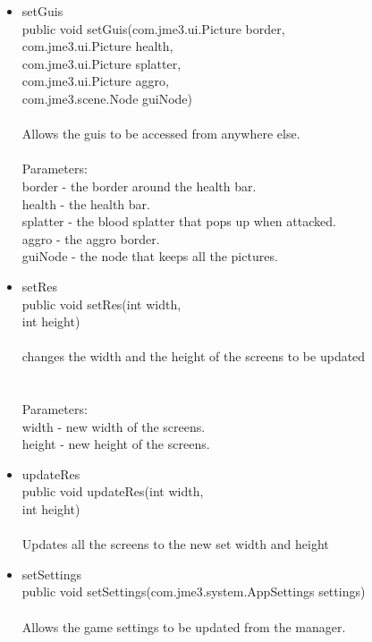 \documentclass[letterpaper]{article}
\begin{document}
\begin{itemize}
\begin{itemize}
		
		\item setGuis \\
		public void setGuis(com.jme3.ui.Picture border, \\
		com.jme3.ui.Picture health, \\
		com.jme3.ui.Picture splatter, \\
		com.jme3.ui.Picture aggro, \\
		com.jme3.scene.Node guiNode) \\ \\
		Allows the guis to be accessed from anywhere else.\\ \\
		Parameters: \\
		    border - the border around the health bar.\\
		    health - the health bar. \\
		    splatter - the blood splatter that pops up when attacked. \\
		    aggro - the aggro border. \\
		    guiNode - the node that keeps all the pictures.\\
		
		
		\item setRes \\
		public void setRes(int width, \\
		int height) \\ \\
		changes the width and the height of the screens to be updated \\ \\ \\
		Parameters: \\
		    width - new width of the screens. \\
		    height - new height of the screens. \\
		
		\item updateRes \\
		public void updateRes(int width, \\                 int height) \\ \\
		Updates all the screens to the new set width and height \\
		
		
		
		\item setSettings \\
		public void setSettings(com.jme3.system.AppSettings settings) \\ \\
		Allows the game settings to be updated from the manager. \\ 
		

\end{itemize}
\end{itemize}
\end{document}
